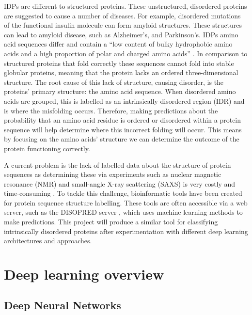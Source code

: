 \documentclass{l4proj}
\begin{document}
IDPs are different to structured proteins. These unstructured, disordered proteins are suggested to cause a number of diseases. For example, disordered mutations of the functional insulin molecule can form amyloid structures. These structures can lead to amyloid disease, such as Alzheimer's, and Parkinson's. IDPs amino acid sequences differ and contain a “low content of bulky hydrophobic amino acids and a high proportion of polar and charged amino acids” \citep{idp_wiki}. In comparison to structured proteins that fold correctly these sequences cannot fold into stable globular proteins, meaning that the protein lacks an ordered three-dimensional structure. The root cause of this lack of structure, causing disorder, is the proteins’ primary structure: the amino acid sequence. When disordered amino acids are grouped, this is labelled as an intrinsically disordered region (IDR) and is where the misfolding occurs. Therefore, making predictions about the probability that an amino acid residue is ordered or disordered within a protein sequence will help determine where this incorrect folding will occur. This means by focusing on the amino acids’ structure we can determine the outcome of the protein functioning correctly. 

A current problem is the lack of labelled data about the structure of protein sequences as determining these via experiments such as nuclear magnetic resonance (NMR) and small-angle X-ray scattering (SAXS) is very costly and time-consuming \citep{disordered_prot_genus_camelus}. To tackle this challenge, bioinformatic tools have been created for protein sequence structure labelling. These tools are often accessible via a web server, such as the DISOPRED server \citep{disopred3_paper}, which uses machine learning methods to make predictions. This project will produce a similar tool for classifying intrinsically disordered proteins after experimentation with different deep learning architectures and approaches.

\section{Deep learning overview}

\subsection{Deep Neural Networks}
\end{document}
